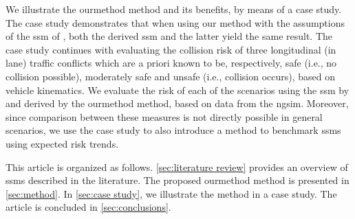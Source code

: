 \cstartb We illustrate the \ac{ourmethod} method and its benefits, by means of a case study. 
The case study demonstrates that when using our method with the assumptions of the \ac{ssm} of \textcite{wang2014evaluation}, both the derived \ac{ssm} and the latter yield the same result.
The case study continues with evaluating the collision risk of three longitudinal (in lane) traffic conflicts which are a priori known to be, respectively, safe (i.e., no collision possible), moderately safe and unsafe (i.e., collision occurs), based on vehicle kinematics. 
We evaluate the risk of each of the scenarios using the \ac{ssm} by \textcite{wang2014evaluation} and  derived by the \ac{ourmethod} method, based on data from the \ac{ngsim}. 
Moreover, since comparison between these measures is not directly possible in general scenarios, we use the case study to also introduce a method to benchmark \acp{ssm} using expected risk trends. \cendb

This article is organized as follows.
\cref{sec:literature review} provides an overview of \acp{ssm} described in the literature.
The proposed \ac{ourmethod} method is presented in \cref{sec:method}.
In \cref{sec:case study}, we illustrate the method in a case study.
The article is concluded in \cref{sec:conclusions}.
